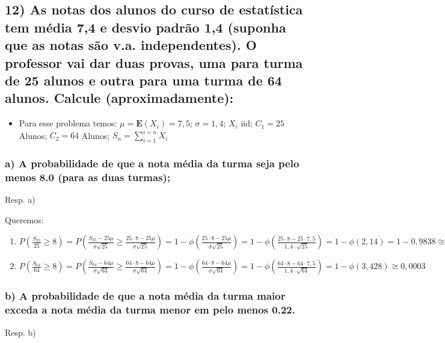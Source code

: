 \documentclass[english]{article}
\begin{document}
\subsection*{\textcompwordmark{}}


\subsection*{\textmd{12) As notas dos alunos do curso de estatística tem média
7,4 e desvio padrão 1,4 (suponha que as notas são v.a. independentes).
O professor vai dar duas provas, uma para turma de 25 alunos e outra
para uma turma de 64 alunos. Calcule (aproximadamente): }}
\begin{itemize}
\item Para esse problema temos: $\mu=\mathbf{E}(X_{i})=7,5$; $\sigma=1,4$;
$X_{i}$ iid; $C_{1}=25$ Alunos; $C_{2}=64$ Alunos; $S_{n}=\sum_{i=1}^{i=n}X_{i}$
\end{itemize}

\subsubsection*{\textmd{a) A probabilidade de que a nota média da turma seja pelo
menos 8.0 (para as duas turmas);}}

Resp. a)

Queremos: 
\begin{enumerate}
\item $P(\frac{S_{25}}{25}\ge8)=P(\frac{S_{25}-25\mu}{\sigma\sqrt{25}}\ge\frac{25\cdot8-25\mu}{\sigma\sqrt{25}})=1-\phi(\frac{25\cdot8-25\mu}{\sigma\sqrt{25}})=1-\phi(\frac{25\cdot8-25\cdot7,5}{1,4\cdot\sqrt{25}})=1-\phi(2,14)=1-0,9838\cong0,016$
\item $P(\frac{S_{64}}{64}\ge8)=P(\frac{S_{64}-64\mu}{\sigma\sqrt{64}}\ge\frac{64\cdot8-64\mu}{\sigma\sqrt{64}})=1-\phi(\frac{64\cdot8-64\mu}{\sigma\sqrt{64}})=1-\phi(\frac{64\cdot8-64\cdot7,5}{1,4\cdot\sqrt{64}})=1-\phi(3,428)\cong0,0003$
\end{enumerate}

\subsubsection*{\textmd{b) A probabilidade de que a nota média da turma maior exceda
a nota média da turma menor em pelo menos 0.22.}}

Resp. b) 
\end{document}
